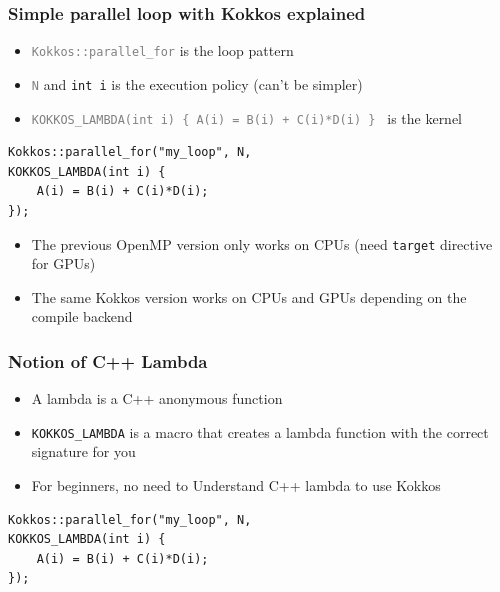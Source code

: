 \documentclass[aspectratio=169]{beamer}
\begin{document}

\begin{frame}[fragile]
    \frametitle{Simple parallel loop with Kokkos explained} 

\normalsize
\begin{itemize}
    \item \textcolor{gray}{\texttt{Kokkos::parallel\_for}} is the loop pattern 
    \item \textcolor{gray}{\texttt{N}} and \texttt{int i} is the execution policy (can't be simpler)
    \item \textcolor{gray}{\texttt{KOKKOS\_LAMBDA(int i) \{ A(i) = B(i) + C(i)*D(i) \} }} is the kernel
\end{itemize}

\small
\begin{verbatim}
Kokkos::parallel_for("my_loop", N, 
KOKKOS_LAMBDA(int i) {
    A(i) = B(i) + C(i)*D(i);
});
\end{verbatim}

\normalsize
\begin{itemize}
    \item The previous OpenMP version only works on CPUs (need \texttt{target} directive for GPUs)
    \item The same Kokkos version works on CPUs and GPUs depending on the compile backend
\end{itemize}


\end{frame}


\begin{frame}[fragile]
    \frametitle{Notion of C++ Lambda} 

\begin{itemize}
    \item A lambda is a C++ anonymous function
    \item \texttt{KOKKOS\_LAMBDA} is a macro that creates a lambda function with the correct signature for you
    \item For beginners, no need to Understand C++ lambda to use Kokkos
\end{itemize}

\small
\begin{verbatim}
Kokkos::parallel_for("my_loop", N, 
KOKKOS_LAMBDA(int i) {
    A(i) = B(i) + C(i)*D(i);
});
\end{verbatim}

\end{frame}
\end{document}
